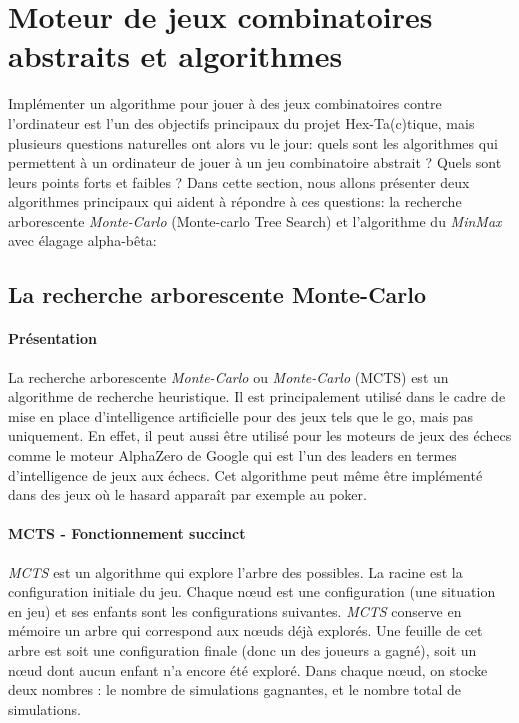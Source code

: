 \section{Moteur de jeux combinatoires abstraits et algorithmes}





Implémenter un algorithme pour jouer à des jeux combinatoires contre l'ordinateur est l'un des objectifs principaux du projet
Hex-Ta(c)tique, mais plusieurs questions naturelles ont alors vu le jour: quels sont les algorithmes qui permettent à un ordinateur
de jouer à un jeu combinatoire abstrait ? Quels sont leurs points forts et faibles ? Dans cette section, nous allons
présenter deux algorithmes principaux qui aident à répondre à ces questions: la recherche arborescente \emph{Monte-Carlo} (Monte-carlo Tree Search) 
et l'algorithme du \emph{MinMax} avec élagage alpha-bêta:

\subsection{La recherche arborescente Monte-Carlo}

\paragraph{Présentation}
La recherche arborescente \emph{Monte-Carlo} ou \emph{Monte-Carlo} (MCTS) est un algorithme de recherche heuristique.
Il est principalement utilisé dans le cadre de mise en place d'intelligence artificielle pour des jeux tels que le go, mais pas uniquement.
En effet, il peut aussi être utilisé pour les moteurs de jeux des échecs comme le moteur AlphaZero de Google qui est
l'un des leaders en termes d'intelligence de jeux aux échecs. Cet algorithme peut même être implémenté dans des jeux où le hasard 
apparaît par exemple au poker.

\paragraph{MCTS - Fonctionnement succinct}
\emph{MCTS} est un algorithme qui explore l'arbre des possibles. La racine est la configuration initiale du jeu.
Chaque nœud est une configuration (une situation en jeu) et ses enfants sont les configurations suivantes. \emph{MCTS} conserve en mémoire 
un arbre qui correspond aux nœuds déjà explorés. Une feuille de cet arbre est soit une configuration finale (donc un des joueurs a gagné),
soit un nœud dont aucun enfant n'a encore été exploré. Dans chaque nœud, on stocke deux nombres : le nombre de simulations gagnantes, 
et le nombre total de simulations. 

